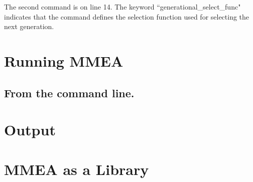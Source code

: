 \documentclass[12pt]{article}
\begin{document}
The second command is on line 14. The keyword ``generational\_select\_func" indicates that the command defines the selection function used for selecting the next generation.

\section{Running MMEA}

\subsection{From the command line.}


\section{Output}

\section{MMEA as a Library}
\end{document}
